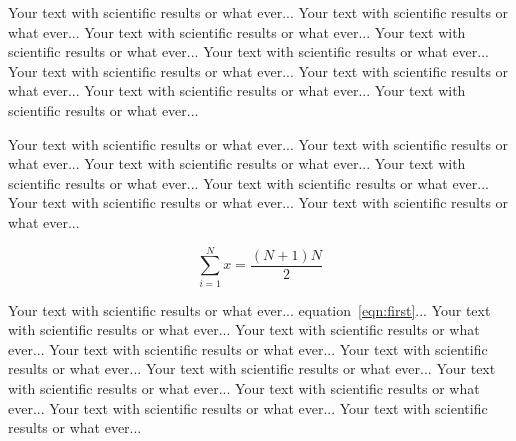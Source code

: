 \documentclass[landscape,a0b,final]{a0poster}
\newenvironment{poster}{
  \begin{center}
  \begin{minipage}[c]{0.98\textwidth}
}{
  \end{minipage} 
  \end{center}
}
\newcommand{\pbox}[4]{
	\psshadowbox[#3]{
		\begin{minipage}[t][#2][t]{#1} #4
		\end{minipage}
	}
}
\begin{document}
\begin{poster}
\begin{multicols}{3}
\vspace{2cm}\begin{center}\pbox{0.8\columnwidth}{}{linewidth=2mm,framearc=0.1,linecolor=lightblue,fillstyle=gradient,gradangle=0,gradbegin=white,gradend=whiteblue,gradmidpoint=1.0,framesep=1em}{\begin{center}Introduction\end{center}}\end{center}\vspace{1.25cm}

Your text with scientific results or what ever... Your text with
scientific results or what ever... Your text with scientific results or
what ever... Your text with scientific results or what ever... Your
text with scientific results or what ever... Your text with scientific
results or what ever... Your text with scientific results or what
ever... Your text with scientific results or what ever... Your text
with scientific results or what ever...

Your text with scientific results or what ever... Your text with
scientific results or what ever... Your text with scientific results or
what ever... Your text with scientific results or what ever... Your
text with scientific results or what ever... Your text with scientific
results or what ever... Your text with scientific results or what
ever...

\begin{equation}\label{eqn:first}
  \sum_{i=1}^{N} x = \frac{(N+1)N}{2}
\end{equation}

Your text with scientific results or what ever...
equation~\ref{eqn:first}... Your text with scientific results or what
ever... Your text with scientific results or what ever... Your text
with scientific results or what ever... Your text with scientific
results or what ever... Your text with scientific results or what
ever... Your text with scientific results or what ever... Your text
with scientific results or what ever... Your text with scientific
results or what ever... Your text with scientific results or what
ever...

\vspace{2cm}\begin{center}\pbox{0.8\columnwidth}{}{linewidth=2mm,framearc=0.1,linecolor=lightblue,fillstyle=gradient,gradangle=0,gradbegin=white,gradend=whiteblue,gradmidpoint=1.0,framesep=1em}{\begin{center}Section\end{center}}\end{center}\vspace{1.25cm}


\end{multicols}
\end{poster}
\end{document}
